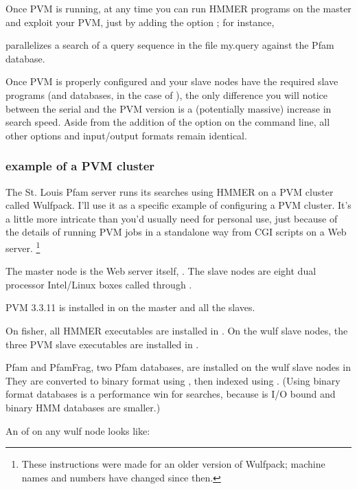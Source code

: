 Once PVM is running, at any time you can run HMMER programs on the
master and exploit your PVM, just by adding the option ;
for instance,


parallelizes a search of a query sequence in the file my.query against
the Pfam database.

Once PVM is properly configured and your slave nodes have the required
slave programs (and databases, in the case of ), the
only difference you will notice between the serial and the PVM version
is a (potentially massive) increase in search speed. Aside from the
addition of the  option on the command line, all other
options and input/output formats remain identical.

\subsubsection{example of a PVM cluster}

The St. Louis Pfam server runs its searches using HMMER on a PVM
cluster called Wulfpack. I'll use it as a specific example of
configuring a PVM cluster. It's a little more intricate than you'd
usually need for personal use, just because of the details of running
PVM jobs in a standalone way from CGI scripts on a Web server.
\footnote{These instructions were made for an older version of
Wulfpack; machine names and numbers have changed since then.}

The master node is the Web server itself, . The slave
nodes are eight dual processor Intel/Linux boxes called 
through . 

PVM 3.3.11 is installed in  on the master and
all the slaves.

On fisher, all HMMER executables are installed in
.  On the wulf slave nodes, the three PVM slave
executables are installed in .

Pfam and PfamFrag, two Pfam databases, are installed on the wulf slave
nodes in  They are converted to binary
format using , then indexed using .
(Using binary format databases is a performance win for 
searches, because  is I/O bound and binary HMM databases
are smaller.)

An  of  on any wulf node looks like:

